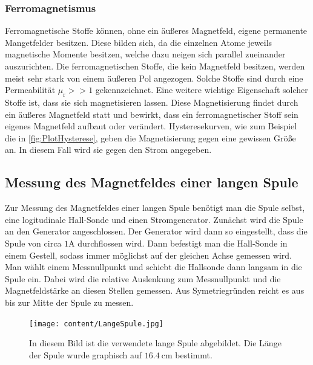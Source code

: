 \subsubsection{Ferromagnetismus}
\label{subsubsec:FERRO}
Ferromagnetische Stoffe können, ohne ein äußeres Magnetfeld, eigene permanente Mangetfelder besitzen. Diese bilden sich, da die einzelnen Atome jeweils magnetische Momente besitzen, welche 
dazu neigen sich parallel zueinander auszurichten. Die ferromagnetischen Stoffe, die kein Magnetfeld besitzen, werden meist sehr stark von einem äußeren Pol angezogen. Solche Stoffe 
sind durch eine Permeabilität $\mu_{\text{r}} >> 1$ gekennzeichnet. Eine weitere wichtige Eigenschaft solcher Stoffe ist, dass sie sich magnetisieren lassen. Diese Magnetisierung findet
durch ein äußeres Magnetfeld statt und bewirkt, dass ein ferromagnetischer Stoff sein eigenes Magnetfeld aufbaut oder verändert. Hysteresekurven, wie zum Beispiel die in \autoref{fig:PlotHysterese},
geben die Magnetisierung gegen eine gewissen Größe an. In diesem Fall wird sie gegen den Strom angegeben.
\subsection{Messung des Magnetfeldes einer langen Spule}
\label{subsec:D_Lange_Spule}
Zur Messung des Magnetfeldes einer langen Spule benötigt man die Spule selbst, eine logitudinale Hall-Sonde und einen Stromgenerator. Zunächst wird die Spule an den Generator angeschlossen.
Der Generator wird dann so eingestellt, dass die Spule von circa $1 \unit{\ampere}$ durchflossen wird. Dann befestigt man die Hall-Sonde in einem Gestell, sodass immer möglichst auf der
gleichen Achse gemessen wird. Man wählt einem Messnullpunkt und schiebt die Hallsonde dann langsam in die Spule ein. Dabei wird die relative Auslenkung zum Messnullpunkt und die Magnetfeldstärke 
an diesen Stellen gemessen. Aus Symetriegründen reicht es aus bis zur Mitte der Spule zu messen.
\begin{figure}
    \centering
    \caption{In diesem Bild ist die verwendete lange Spule abgebildet. Die Länge der Spule wurde graphisch auf $16.4 \: \unit{\centi\metre}$ bestimmt.}
    \label{fig:Aufbau_lange_Spule}
    \texttt{[image: content/LangeSpule.jpg]}
\end{figure}
